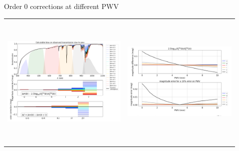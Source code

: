 \documentclass{beamer}
\begin{document}
\begin{frame}{Order 0 corrections at different PWV}

\begin{tabular}{cc}
\includegraphics[width=6cm,height=6.5cm,angle=0]{figs/PCCorr/fig1_PCCorrOrder0th_PWV.png} &
\includegraphics[width=5.5cm,height=6cm,angle=0]{figs/PCCorr/fig2_PCCorrOrder0th_PWV.png}
\end{tabular}
\end{frame}
\end{document}
